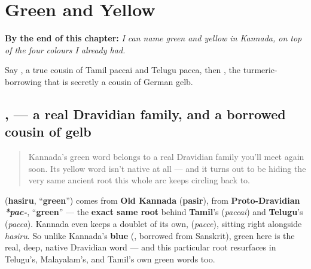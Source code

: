 
\chapter{Green and Yellow}
\label{ch:ka-green-and-yellow}

\begin{chapteropening}
\textbf{By the end of this chapter:} \emph{I can name green and yellow in Kannada, on top of the four colours I already had.}

Say , a true cousin of Tamil paccai and Telugu pacca, then , the turmeric-borrowing that is secretly a cousin of German gelb.
\end{chapteropening}

\section[\texorpdfstring{\kn{ಹಸಿರು}, \kn{ಹಳದಿ} (hasiru haḷadi)}{ಹಸಿರು, ಹಳದಿ (hasiru haḷadi)}]{,  — a real Dravidian family, and a borrowed cousin of gelb}

\label{lesson:KA-C22-hasiru-haladi}



\begin{quote}
Kannada's green word belongs to a real Dravidian family you'll meet again soon. Its yellow word isn't native at all — and it turns out to be hiding the very same ancient root this whole arc keeps circling back to.
\end{quote}

\begin{cousinweb}
\textbf{} (\textbf{hasiru}, \textquotedblleft{}\textbf{green}\textquotedblright{}) comes from \textbf{Old Kannada} \textbf{} (\textbf{pasir}), from \textbf{Proto-Dravidian} \emph{\textbf{*pac-}}, \textquotedblleft{}\textbf{green}\textquotedblright{} — the \textbf{exact same root} behind \textbf{Tamil}'s \textbf{} (\emph{paccai}) and \textbf{Telugu}'s \textbf{} (\emph{pacca}). Kannada even keeps a doublet of its own, \textbf{} (\emph{pacce}), sitting right alongside \emph{hasiru}. So unlike Kannada's \textbf{blue} (, borrowed from Sanskrit), green here is the real, deep, native Dravidian word — and this particular root resurfaces in Telugu's, Malayalam's, and Tamil's own green words too.
\end{cousinweb}

